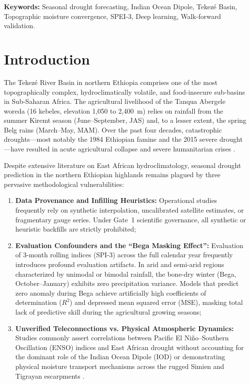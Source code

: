 \documentclass{article}
\begin{document}
\noindent\textbf{Keywords:} Seasonal drought forecasting, Indian Ocean Dipole, Tekez\'{e} Basin, Topographic moisture convergence, SPEI-3, Deep learning, Walk-forward validation.

\section{Introduction}
\label{sec:intro}
The Tekez\'{e} River Basin in northern Ethiopia comprises one of the most topographically complex, hydroclimatically volatile, and food-insecure sub-basins in Sub-Saharan Africa. The agricultural livelihood of the Tanqua Abergele woreda (16 kebeles, elevation 1,050 to 2,400~m) relies on rainfall from the summer Kiremt season (June--September, JAS) and, to a lesser extent, the spring Belg rains (March--May, MAM). Over the past four decades, catastrophic droughts—most notably the 1984 Ethiopian famine and the 2015 severe drought—have resulted in acute agricultural collapse and severe humanitarian crises \citep{drew_drought_2020, funk_chirps_2015}.

Despite extensive literature on East African hydroclimatology, seasonal drought prediction in the northern Ethiopian highlands remains plagued by three pervasive methodological vulnerabilities:
\begin{enumerate}
    \item \textbf{Data Provenance and Infilling Heuristics:} Operational studies frequently rely on synthetic interpolation, uncalibrated satellite estimates, or fragmentary gauge series. Under Gate~1 scientific governance, all synthetic or heuristic backfills are strictly prohibited;
    \item \textbf{Evaluation Confounders and the ``Bega Masking Effect'':} Evaluation of 3-month rolling indices ($\text{SPI-3}$) across the full calendar year frequently introduces profound evaluation artifacts. In arid and semi-arid regions characterized by unimodal or bimodal rainfall, the bone-dry winter (Bega, October--January) exhibits zero precipitation variance. Models that predict zero anomaly during Bega achieve artificially high coefficients of determination ($R^2$) and depressed mean squared error (MSE), masking total lack of predictive skill during the agricultural growing seasons;
    \item \textbf{Unverified Teleconnections vs. Physical Atmospheric Dynamics:} Studies commonly assert correlations between Pacific El Ni\~{n}o--Southern Oscillation (ENSO) indices and East African drought without accounting for the dominant role of the Indian Ocean Dipole (IOD) or demonstrating physical moisture transport mechanisms across the rugged Simien and Tigrayan escarpments \citep{saji1999dipole, behera2005param}.
\end{enumerate}
\end{document}
